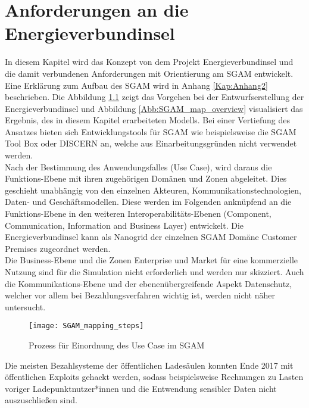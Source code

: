 \chapter{Anforderungen an die Energieverbundinsel}
	\label{Kap3}
	In diesem Kapitel wird das Konzept von dem Projekt Energieverbundinsel und die damit verbundenen Anforderungen mit Orientierung am SGAM entwickelt. Eine Erklärung zum Aufbau des SGAM wird in Anhang \ref{Kap:Anhang2} beschrieben. Die Abbildung \ref{Abb:SGAM_mapping_steps} zeigt das Vorgehen bei der Entwurfserstellung der Energieverbundinsel und Abbildung \ref{Abb:SGAM_map_overview} visualisiert das Ergebnis, des in diesem Kapitel erarbeiteten Modells. Bei einer Vertiefung des Ansatzes bieten sich Entwicklungstools für SGAM wie beispielsweise die SGAM Tool Box oder DISCERN an, welche aus Einarbeitungsgründen nicht verwendet werden. \\
	
	Nach der Bestimmung des Anwendungsfalles (Use Case), wird daraus die Funktions-Ebene  mit ihren zugehörigen Domänen und Zonen abgeleitet. Dies geschieht unabhängig von den einzelnen Akteuren, Kommunikationstechnologien, Daten- und Geschäftsmodellen. Diese werden im Folgenden anknüpfend an die Funktions-Ebene in den weiteren Interoperabilitäts-Ebenen (Component, Communication, Information and Business Layer) entwickelt. Die Energieverbundinsel kann als Nanogrid der einzelnen SGAM Domäne Customer Premises zugeordnet werden. \\ 
	
	Die Business-Ebene und die Zonen Enterprise und Market für eine kommerzielle Nutzung sind für die Simulation nicht erforderlich und werden nur skizziert. Auch die Kommunikations-Ebene und der ebenenübergreifende Aspekt Datenschutz, welcher vor allem bei Bezahlungsverfahren wichtig ist, werden nicht näher untersucht.\\
		
	\begin{figure}[h]
		\centering
		\texttt{[image: SGAM\_mapping\_steps]}
		\caption{Prozess für Einordnung des Use Case im SGAM}
		\label{Abb:SGAM_mapping_steps}
	\end{figure} 
			
	Die meisten Bezahlsysteme der öffentlichen Ladesäulen konnten Ende 2017 mit öffentlichen Exploits gehackt werden, sodass beispielsweise Rechnungen zu Lasten voriger Ladepunktnutzer*innen und die Entwendung sensibler Daten nicht auszuschließen sind. \cite{CCC}  \cite{evsim}  \\ 	
	
